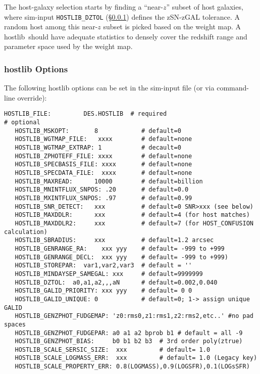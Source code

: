 \documentclass[12pt]{article}
\newcommand{\hostlib}{{\sc hostlib}}
\begin{document}
{The host-galaxy selection starts by finding a ``near-$z$''
subset of host galaxies, where sim-input {\tt HOSTLIB\_DZTOL} 
(\S\ref{sss:hostlib_options})
defines the zSN-zGAL tolerance.
A random host among this near-$z$ subset is 
picked based on the weight map.
A \hostlib\ should have adequate statistics to densely
cover the redshift range and parameter space used by
the weight map.


\clearpage
\subsubsection{{\hostlib} Options}
\label{sss:hostlib_options}

The following {\hostlib} options can be set in
the sim-input file (or via command-line override):
%
\begin{Verbatim}[frame=single]
   HOSTLIB_FILE:         DES.HOSTLIB  # required
# optional
   HOSTLIB_MSKOPT:       8            # default=0
   HOSTLIB_WGTMAP_FILE:   xxxx        # default=none
   HOSTLIB_WGTMAP_EXTRAP: 1           # decault=0
   HOSTLIB_ZPHOTEFF_FILE: xxxx        # default=none
   HOSTLIB_SPECBASIS_FILE: xxxx       # default=none
   HOSTLIB_SPECDATA_FILE:  xxxx       # default=none
   HOSTLIB_MAXREAD:      10000        # default=billion
   HOSTLIB_MNINTFLUX_SNPOS: .20       # default=0.0
   HOSTLIB_MXINTFLUX_SNPOS: .97       # default=0.99
   HOSTLIB_SNR_DETECT:   xxx          # default=0 SNR>xxx (see below)
   HOSTLIB_MAXDDLR:      xxx          # default=4 (for host matches)
   HOSTLIB_MAXDDLR2:     xxx          # default=7 (for HOST_CONFUSION calculation)
   HOSTLIB_SBRADIUS:     xxx          # default=1.2 arcsec
   HOSTLIB_GENRANGE_RA:    xxx yyy    # default= -999 to +999
   HOSTLIB_GENRANGE_DECL:  xxx yyy    # default= -999 to +999)   
   HOSTLIB_STOREPAR:  var1,var2,var3  # default = ''
   HOSTLIB_MINDAYSEP_SAMEGAL: xxx     # default=9999999
   HOSTLIB_DZTOL:  a0,a1,a2,,,aN      # default=0.002,0.040
   HOSTLIB_GALID_PRIORITY: xxx yyy    # default= 0 0 
   HOSTLIB_GALID_UNIQUE: 0            # default=0; 1-> assign unique GALID
   HOSTLIB_GENZPHOT_FUDGEMAP: 'z0:rms0,z1:rms1,z2:rms2,etc..' #no pad spaces
   HOSTLIB_GENZPHOT_FUDGEPAR: a0 a1 a2 bprob b1 # default = all -9
   HOSTLIB_GENZPHOT_BIAS:     b0 b1 b2 b3  # 3rd order poly(ztrue)
   HOSTLIB_SCALE_SERSIC_SIZE:  xxx         # default= 1.0
   HOSTLIB_SCALE_LOGMASS_ERR:  xxx         # default= 1.0 (Legacy key)
   HOSTLIB_SCALE_PROPERTY_ERR: 0.8(LOGMASS),0.9(LOGSFR),0.1(LOGsSFR)   

\end{Verbatim}}
\end{document}
